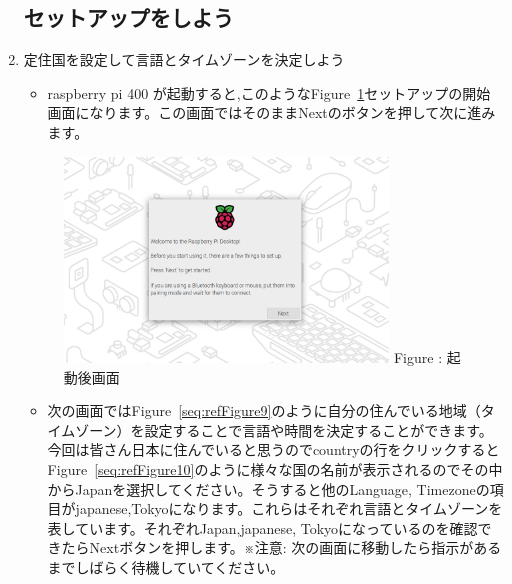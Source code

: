 \documentclass[a4paper,12pt]{jarticle}
\begin{document}
\begin{enumerate}

  \subsection{セットアップをしよう}
  \item 定住国を設定して言語とタイムゾーンを決定しよう
        \begin{itemize}
          \item
                raspberry pi 400 が起動すると,このようなFigure~\ref{seq:refFigure8}セットアップの開始画面になります。この画面ではそのままNextのボタンを押して次に進みます。
        \end{itemize} 
        \begin{figure}[h]
          \centering
          \begin{minipage}{5.222cm}
          {\upshape
            \includegraphics[width=8.613cm]{sw_image01.png}
            \newline
            Figure {\theFigure\label{seq:refFigure8}}:
            起動後画面
          }
        \end{minipage}
        \end{figure}

        \begin{itemize}
          \item
              次の画面ではFigure~\ref{seq:refFigure9}のように自分の住んでいる地域（タイムゾーン）を設定することで言語や時間を決定することができます。今回は皆さん日本に住んでいると思うのでcountryの行をクリックするとFigure~\ref{seq:refFigure10}のように様々な国の名前が表示されるのでその中からJapanを選択してください。そうすると他のLanguage, Timezoneの項目がjapanese,Tokyoになります。これらはそれぞれ言語とタイムゾーンを表しています。それぞれJapan,japanese, Tokyoになっているのを確認できたらNextボタンを押します。※注意: 次の画面に移動したら指示があるまでしばらく待機していてください。
            

\end{itemize}
\end{enumerate}
\end{document}
